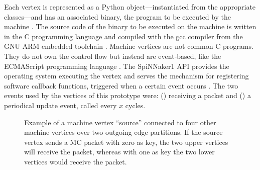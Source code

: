 \documentclass[]{article}
\begin{document}
Each vertex is represented as a Python object---instantiated from the
appropriate classes---and has an associated binary, the program to
be executed by the machine \citep{furber_et_al_2020}.
The source code of the binary to be executed on the machine is written
in the C programming language and compiled with the gcc compiler from
the GNU ARM embedded toolchain \citep{arm_2020, rowley_et_al_2019}.
Machine vertices are not common C programs.
They do not own the control flow but instead are event-based, like
the ECMAScript programming language \citep{ecma_2020}.
The SpiNNaker1 API provides the operating system executing the vertex
and serves the mechanism for registering software callback functions,
triggered when a certain event occurs \citep{furber_et_al_2020}.
The two events used by the vertices of this prototype were:
() receiving a packet and () a
periodical update event, called every $x$ cycles.

\begin{figure}
\begin{center}
\end{center}
\caption{Example of a machine vertex ``source'' connected to four
  other machine vertices over two outgoing edge partitions. If the
  source vertex sends a MC packet with zero as key, the two upper
  vertices will receive the packet, whereas with one as key the two
  lower vertices would receive the packet.}
\label{fig:partitions}
\end{figure}
\end{document}
